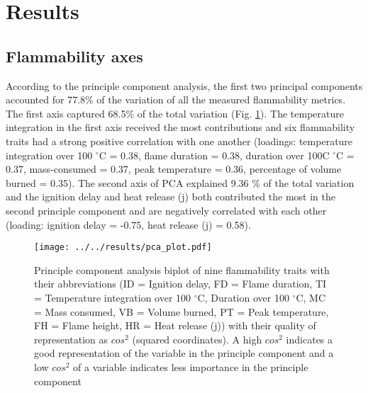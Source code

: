 \documentclass[12pt]{report}
\begin{document}




\section{Results}

\subsection{Flammability axes}
According to the principle component analysis, the first two principal components accounted for 77.8\% of the variation of all the measured flammability metrics. The first axis %
captured 68.5\% of the total variation (Fig. \ref{fig:pca-plot}). The temperature integration in the first axis received the most contributions and six flammability traits had a strong positive correlation with one another (loadings: temperature integration over 100 $^{\circ}$C = 0.38, flame duration = 0.38, duration over 100C $^{\circ}$C = 0.37, mass-consumed = 0.37, peak temperature  = 0.36, percentage of volume burned = 0.35). The second axis of PCA explained 9.36 \% of the total variation and the ignition delay and heat release (j) both contributed the most in the second principle component and are negatively correlated with each other (loading: ignition delay = -0.75, heat release (j) = 0.58). 

\begin{figure}  %
    \centering
    \texttt{[image: ../../results/pca\_plot.pdf]}
    \caption[Principle components results]{\label{fig:pca-plot} Principle component analysis biplot of nine flammability traits with their abbreviations (ID = Ignition delay, FD = Flame duration, TI = Temperature integration over 100 $^{\circ}$C, Duration over 100 $^{\circ}$C, MC = Mass consumed, VB = Volume burned, PT = Peak temperature, FH = Flame height, HR = Heat release (j)) with their quality of representation as $cos^2$ (squared coordinates). A high $cos^2$ indicates a good representation of the variable in the principle component and a low $cos^2$ of a variable indicates less importance in the principle component}
  \end{figure}
\end{document}
